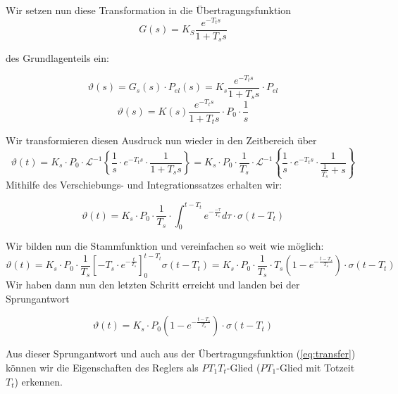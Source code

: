 \documentclass{report}
\begin{document}
Wir setzen nun diese Transformation in die Übertragungsfunktion
\begin{equation}
  \label{eq:transfer}
  G(s) = K_{S} \frac{e^{-T_{t}s}}{1+T_{s}s}
\end{equation}

des Grundlagenteils ein:

\begin{equation}
  \label{eq:4}
  \vartheta(s) = G_{s}(s)\cdot P_{el}(s) = K_{s}\frac{e^{-T_{t}s}}{1+T_{s}s}\cdot P_{el}
\end{equation}
\begin{equation}
  \label{eq:5}
  \vartheta(s) = K(s)\frac{e^{-T_{t}s}}{1+T_{t}s}\cdot P_{0} \cdot \frac{1}{s}
\end{equation}

Wir transformieren diesen Ausdruck nun wieder in den Zeitbereich über
\begin{equation}
  \label{eq:6}
  \vartheta(t) = K_{s} \cdot P_{0}\cdot \mathcal{L}^{-1}\left\{\frac{1}{s}\cdot e^{-T_{t}s}\cdot\frac{1}{1+T_{s}s}\right\} = K_{s} \cdot P_{0} \cdot \frac{1}{T_{s}} \cdot \mathcal{L}^{-1}\left\{\frac{1}{s}\cdot e^{-T_{t}s}\cdot \frac{1}{\frac{1}{T_{s}}+s}\right\}
\end{equation}
Mithilfe des Verschiebungs- und Integrationssatzes erhalten wir:

\begin{equation}
  \label{eq:7}
  \vartheta(t) = K_{s}\cdot P_{0}\cdot \frac{1}{T_{s}}\cdot \int_{0}^{t-T_{t}}e^{-\frac{-\tau}{T_{s}}}d\tau \cdot \sigma(t-T_{t})
\end{equation}

Wir bilden nun die Stammfunktion und vereinfachen so weit wie möglich:
\begin{equation}
  \label{eq:8}
  \vartheta(t) = K_{s}\cdot P_{0} \cdot \frac{1}{T_{s}} \left[-T_{s}\cdot e^{-\frac{t}{T_{s}}}\right]_{0}^{t-T_{t}}\sigma(t-T_{t}) = K_{s}\cdot P_{0} \cdot \frac{1}{T_{s}} \cdot T_{s} \left(1-e^{-\frac{t-T_{s}}{T_{s}}}\right) \cdot \sigma(t-T_{t})
\end{equation}
Wir haben dann nun den letzten Schritt erreicht und landen bei der Sprungantwort

\begin{equation}
  \label{eq:9}
  \vartheta(t) = K_{s}\cdot P_{0} \left(1-e^{-\frac{t-T_{s}}{T_{s}}}\right)\cdot \sigma(t-T_{t})
\end{equation}

Aus dieser Sprungantwort und auch aus der Übertragungsfunktion (\ref{eq:transfer}) können wir die Eigenschaften des Reglers als $PT_{1}T_{t}$-Glied ($PT_{1}$-Glied mit Totzeit $T_{t}$) erkennen.
\end{document}
